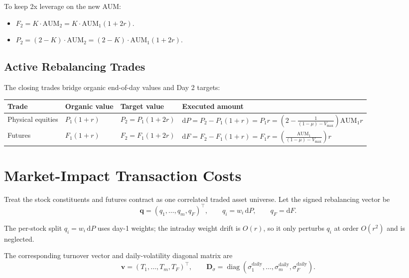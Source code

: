 \documentclass[11pt]{article}
\begin{document}
To keep 2x leverage on the new AUM:
\begin{itemize}
  \item $F_2 = K \cdot \mathrm{AUM}_2 = K \cdot \mathrm{AUM}_1(1 + 2r)$.
  \item $P_2 = (2 - K) \cdot \mathrm{AUM}_2
    = (2 - K) \cdot \mathrm{AUM}_1(1 + 2r)$.
\end{itemize}

\subsection{Active Rebalancing Trades}

The closing trades bridge organic end-of-day values and Day 2 targets:

\begin{center}
\renewcommand{\arraystretch}{1.35}
\begin{tabular}{@{}p{}p{}p{}p{}@{}}
\toprule
Trade & Organic value & Target value & Executed amount \\
\midrule
Physical equities &
$P_1(1 + r)$ &
$P_2 = P_1(1 + 2r)$ &
$\mathrm{d}P = P_2 - P_1(1 + r) = P_1r
= \left(2 - \frac{1}{(1 - \mu) - V_{\mathrm{max}}}\right)\mathrm{AUM}_1r$ \\
Futures &
$F_1(1 + r)$ &
$F_2 = F_1(1 + 2r)$ &
$\mathrm{d}F = F_2 - F_1(1 + r) = F_1r
= \left(\frac{\mathrm{AUM}_1}{(1 - \mu) - V_{\mathrm{max}}}\right)r$ \\
\bottomrule
\end{tabular}
\end{center}

\section{Market-Impact Transaction Costs}
\label{sec:impact}

Treat the stock constituents and futures contract as one correlated traded asset
universe. Let the signed rebalancing vector be
\[
  \mathbf{q}
  = (q_1,\ldots,q_m,q_F)^\top,
  \qquad
  q_i = w_i\,\mathrm{d}P,
  \qquad
  q_F = \mathrm{d}F.
\]

The per-stock split $q_i = w_i\,\mathrm{d}P$ uses day-1 weights; the intraday
weight drift is $O(r)$, so it only perturbs $q_i$ at order $O(r^2)$ and is
neglected.

The corresponding turnover vector and daily-volatility diagonal matrix are
\[
  \mathbf{v} = (T_1,\ldots,T_m,T_F)^\top,
  \qquad
  \mathbf{D}_{\sigma}
  = \operatorname{diag}(\sigma_1^{\mathrm{daily}},\ldots,
  \sigma_m^{\mathrm{daily}},\sigma_F^{\mathrm{daily}}).
\]
\end{document}
